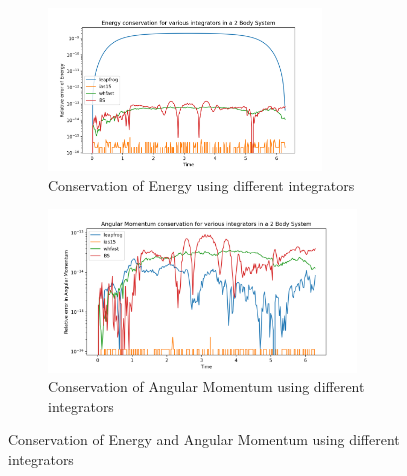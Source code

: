 \documentclass[12pt,a4paper]{article}
\begin{document}
\begin{figure}[H]
  \centering
  \begin{subfigure}{0.49\textwidth}
    \includegraphics[height = 1.7in]{2Body/2Body_Energy_Consv_int.png}
    \caption{Conservation of Energy using different integrators}
    \label{fig:int_e}  
  \end{subfigure}
  \begin{subfigure}{0.49\textwidth}
    \includegraphics[height = 1.7in]{2Body/2Body_L_Consv_int.png}
    \caption{Conservation of Angular Momentum using different integrators}
    \label{fig:int_L}  
  \end{subfigure}
  \caption{Conservation of Energy and Angular Momentum using different integrators}
\end{figure}
\end{document}
